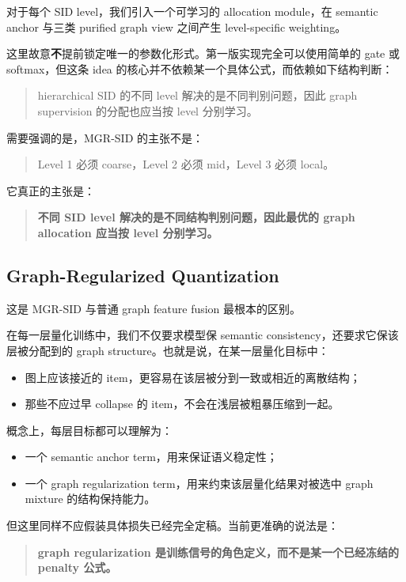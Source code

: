 \documentclass[11pt]{article}
\begin{document}
对于每个 SID level，我们引入一个可学习的 allocation module，在 semantic anchor 与三类 purified graph view 之间产生 level-specific weighting。

这里故意\textbf{不}提前锁定唯一的参数化形式。第一版实现完全可以使用简单的 gate 或 softmax，但这条 idea 的核心并不依赖某一个具体公式，而依赖如下结构判断：
\begin{quote}
hierarchical SID 的不同 level 解决的是不同判别问题，因此 graph supervision 的分配也应当按 level 分别学习。
\end{quote}

需要强调的是，MGR-SID 的主张不是：
\begin{quote}
Level 1 必须 coarse，Level 2 必须 mid，Level 3 必须 local。
\end{quote}

它真正的主张是：
\begin{quote}
\textbf{不同 SID level 解决的是不同结构判别问题，因此最优的 graph allocation 应当按 level 分别学习。}
\end{quote}

\subsection{Graph-Regularized Quantization}

这是 MGR-SID 与普通 graph feature fusion 最根本的区别。

在每一层量化训练中，我们不仅要求模型保 semantic consistency，还要求它保该层被分配到的 graph structure。也就是说，在某一层量化目标中：
\begin{itemize}
  \item 图上应该接近的 item，更容易在该层被分到一致或相近的离散结构；
  \item 那些不应过早 collapse 的 item，不会在浅层被粗暴压缩到一起。
\end{itemize}

概念上，每层目标都可以理解为：
\begin{itemize}
  \item 一个 semantic anchor term，用来保证语义稳定性；
  \item 一个 graph regularization term，用来约束该层量化结果对被选中 graph mixture 的结构保持能力。
\end{itemize}

但这里同样不应假装具体损失已经完全定稿。当前更准确的说法是：
\begin{quote}
\textbf{graph regularization 是训练信号的角色定义，而不是某一个已经冻结的 penalty 公式。}
\end{quote}
\end{document}
